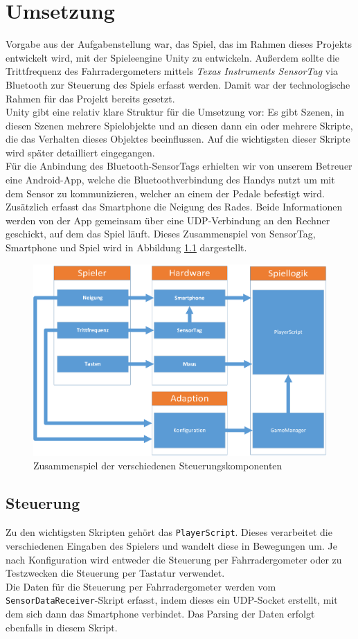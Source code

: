 \chapter{Umsetzung}
\label{Umsetzung}
Vorgabe aus der Aufgabenstellung war, das Spiel, das im Rahmen dieses Projekts entwickelt wird, mit der Spieleengine Unity zu entwickeln. Außerdem sollte die Trittfrequenz des Fahrradergometers mittels \textit{Texas Instruments SensorTag} via Bluetooth zur Steuerung des Spiels erfasst werden. Damit war der technologische Rahmen für das Projekt bereits gesetzt.\\
Unity gibt eine relativ klare Struktur für die Umsetzung vor: Es gibt Szenen, in diesen Szenen mehrere Spielobjekte und an diesen dann ein oder mehrere Skripte, die das Verhalten dieses Objektes beeinflussen. Auf die wichtigsten dieser Skripte wird später detailliert eingegangen.\\
Für die Anbindung des Bluetooth-SensorTags erhielten wir von unserem Betreuer eine Android-App, welche die Bluetoothverbindung des Handys nutzt um mit dem Sensor zu kommunizieren, welcher an einem der Pedale befestigt wird. Zusätzlich erfasst das Smartphone die Neigung des Rades. Beide Informationen werden von der App gemeinsam über eine UDP-Verbindung an den Rechner geschickt, auf dem das Spiel läuft. Dieses Zusammenspiel von SensorTag, Smartphone und Spiel wird in Abbildung \ref{Steuerung} dargestellt.\\
\begin{figure}[ht]
\centering
\includegraphics[width=.7\textwidth]{gfx/Steuerung.png}
\caption{Zusammenspiel der verschiedenen Steuerungskomponenten}
\label{Steuerung}
\end{figure}
\section{Steuerung}
Zu den wichtigsten Skripten gehört das \texttt{PlayerScript}. Dieses verarbeitet die verschiedenen Eingaben des Spielers und wandelt diese in Bewegungen um. Je nach Konfiguration wird entweder die Steuerung per Fahrradergometer oder zu Testzwecken die Steuerung per Tastatur verwendet.\\
Die Daten für die Steuerung per Fahrradergometer werden vom \texttt{SensorDataReceiver}-Skript erfasst, indem dieses ein UDP-Socket erstellt, mit dem sich dann das Smartphone verbindet. Das Parsing der Daten erfolgt ebenfalls in diesem Skript.
